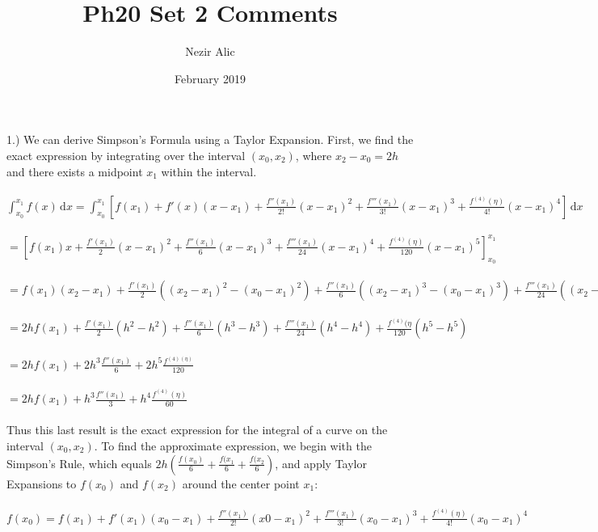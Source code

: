 \documentclass{article}
\title{Ph20 Set 2 Comments}
\author{Nezir Alic}
\date{February 2019}
\begin{document}
\maketitle

1.) We can derive Simpson's Formula using a Taylor Expansion. First, we find the exact expression by integrating over the interval $(x_0, x_2)$, where $x_2 - x_0 = 2h$ and there exists a midpoint $x_1$ within the interval.
\\
\\
$
\int_{x_0}^{x_1} \! f(x) \, \mathrm{d}x = \int_{x_0}^{x_1} \! [f(x_1) + f'(x)(x - x_1) + {\frac{f''(x_1)}{2!}}(x - x_1)^2 + {\frac{f'''(x_1)}{3!}}(x - x_1)^3 + {\frac{f^{(4)}(\eta)}{4!}}(x - x_1)^4] \, \mathrm{d}x
$
\\ 
\\
$= [f(x_1)x + {\frac{f'(x_1)}{2}}(x - x_1)^2 + {\frac{f''(x_1)}{6}}(x - x_1)^3 + {\frac{f'''(x_1)}{24}}(x - x_1)^4  + {\frac{f^{(4)}(\eta)}{120}}(x - x_1)^5]_{x_0}^{x_1}$
\\
\\
$
= f(x_1)(x_2 - x_1) + {\frac{f'(x_1)}{2}}((x_2 - x_1)^2 - (x_0 - x_1)^2) + {\frac{f''(x_1)}{6}}((x_2 - x_1)^3 - (x_0 - x_1)^3) + {\frac{f'''(x_1)}{24}}((x_2 - x_1)^4 - (x_0 - x_1)^4) + {\frac{f^{(4)}(\eta)}{120}}((x_2 - x_1)^5 - (x_0 - x_1)^5)]_{x_0}^{x_1}
$
\\
\\
$
= 2hf(x_1) + \frac{f'(x_1)}{2}(h^2 - h^2) + \frac{f''(x_1)}{6}(h^3 - h^3) + \frac{f'''(x_1)}{24}(h^4 - h^4) + \frac{f^{(4)}(\eta}{120}(h^5 - h^5)
$
\\
\\
$
= 2hf(x_1) + 2h^3\frac{f''(x_1)}{6} + 2h^5\frac{f^{(4)(\eta)}}{120}
$
\\
\\
$
= 2hf(x_1) + h^3\frac{f''(x_1)}{3} + h^4\frac{f^{(4)}(\eta)}{60}
$
\\
\\
Thus this last result is the exact expression for the integral of a curve on the interval $(x_0, x_2)$. To find the approximate expression, we begin with the Simpson's Rule, which equals $2h(\frac{f(x_0)}{6} + \frac{f(x_1}{6} + \frac{f(x_2}{6})$, and apply Taylor Expansions to $f(x_0)$ and $f(x_2)$ around the center point $x_1$:
\\
\\
$
f(x_0) = f(x_1) + f'(x_1)(x_0 - x_1) + \frac{f''(x_1)}{2!}(x0 - x_1)^2 + \frac{f'''(x_1)}{3!}(x_0 - x_1)^3 + \frac{f^{(4)}(\eta)}{4!}(x_0 - x_1)^4
$
\\
\\
\end{document}
